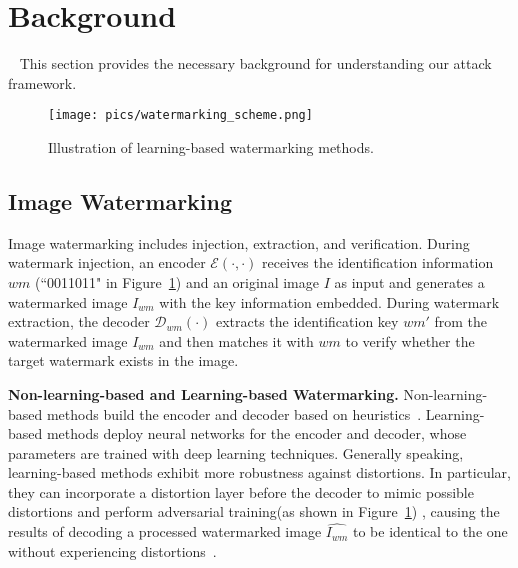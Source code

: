 \section{Background}~\label{sec:background}
This section provides the necessary background for understanding our attack framework.

\begin{figure}[!t]
    \centering
    \texttt{[image: pics/watermarking\_scheme.png]} 
    
    \caption{Illustration of learning-based watermarking methods.} 
    \label{fig:watermark}
    \vspace{-3mm}
\end{figure}

\subsection{Image Watermarking}
Image watermarking includes injection, extraction, and verification. During watermark injection, an encoder $\mathcal{E}(\cdot,\cdot)$ receives the identification information $wm$ (``0011011" in Figure~\ref{fig:watermark}) and an original image $I$ as input and generates a watermarked image $I_{wm}$ with the key information embedded. During watermark extraction, the decoder $\mathcal{D}_{wm}(\cdot)$ extracts the identification key $wm'$ from the watermarked image $I_{wm}$ and then matches it 
 with $wm$ to verify whether the target watermark exists in the image.

\textbf{Non-learning-based and Learning-based Watermarking.} Non-learning-based methods build the encoder and decoder based on heuristics~\cite{jiang2023evading}. Learning-based methods deploy neural networks for the encoder and decoder, whose parameters are trained with deep learning techniques. Generally speaking, learning-based methods exhibit more robustness against distortions. In particular, they can incorporate a distortion layer before the decoder to mimic possible distortions and perform adversarial training(as shown in Figure~\ref{fig:watermark}) , causing the results of decoding a processed watermarked image $\hat{I_{wm}}$ to be identical to the one without experiencing distortions~\cite{jiang2023evading}.    

